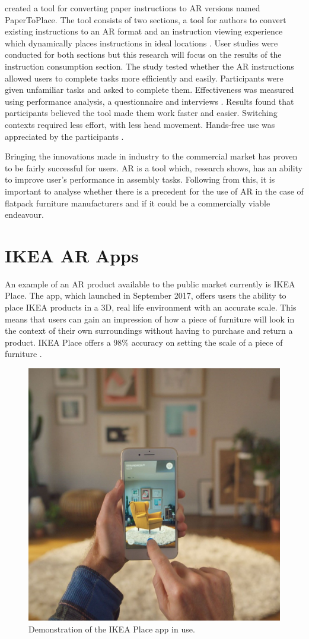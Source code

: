 \documentclass{l4proj}
\begin{document}
\citet{chen_papertoplace_2023} created a tool for converting paper instructions to AR versions named PaperToPlace. The tool consists of two sections, a tool for authors to convert existing instructions to an AR format and an instruction viewing experience which dynamically places instructions in ideal locations \citep{chen_papertoplace_2023}. User studies were conducted for both sections but this research will focus on the results of the instruction consumption section. The study tested whether the AR instructions allowed users to complete tasks more efficiently and easily. Participants were given unfamiliar tasks and asked to complete them. Effectiveness was measured using performance analysis, a questionnaire and interviews \citep{chen_papertoplace_2023}. Results found that participants believed the tool made them work faster and easier. Switching contexts required less effort, with less head movement. Hands-free use was appreciated by the participants \citep{chen_papertoplace_2023}.

Bringing the innovations made in industry to the commercial market has proven to be fairly successful for users. AR is a tool which, research shows, has an ability to improve user's performance in assembly tasks. Following from this, it is important to analyse whether there is a precedent for the use of AR in the case of flatpack furniture manufacturers and if it could be a commercially viable endeavour. 

\section{IKEA AR Apps}

An example of an AR product available to the public market currently is IKEA Place. The app, which launched in September 2017, offers users the ability to place IKEA products in a 3D, real life environment with an accurate scale. This means that users can gain an impression of how a piece of furniture will look in the context of their own surroundings without having to purchase and return a product. IKEA Place offers a 98\% accuracy on setting the scale of a piece of furniture \citep{ikea_launch_2017}.

\begin{figure}[hbt!]
    \centering
    \includegraphics[width=0.5\linewidth]{dissertation//images/IKEAPlace.jpg}
    \caption{Demonstration of the IKEA Place app in use. \citep{ikea_launch_2017}}
    \label{fig:ikeaPlace}
\end{figure}
\end{document}
